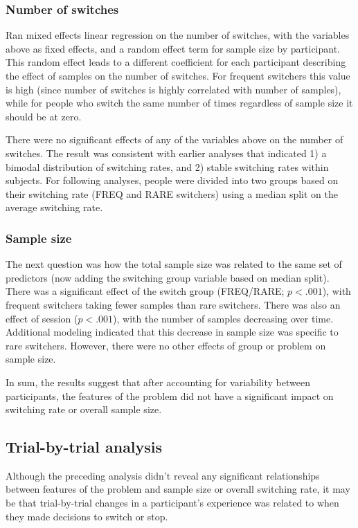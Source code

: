 \documentclass[english,doc]{apa}
\begin{document}
\subsubsection{Number of switches}

Ran mixed effects linear regression on the number of switches, with the variables above as fixed effects, and a random effect term for sample size by participant. 
This random effect leads to a different coefficient for each participant describing the effect of samples on the number of switches. 
For frequent switchers this value is high (since number of switches is highly correlated with number of samples), while for people who switch the same number of times regardless of sample size it should be at zero.

There were no significant effects of any of the variables above on the number of switches.
The result was consistent with earlier analyses that indicated 1) a bimodal distribution of switching rates, and 2) stable switching rates within subjects.
For following analyses, people were divided into two groups based on their switching rate (FREQ and RARE switchers) using a median split on the average switching rate.


\subsubsection{Sample size}

The next question was how the total sample size was related to the same set of predictors (now adding the switching group variable based on median split).
There was a significant effect of the switch group (FREQ/RARE; $p<.001$), with frequent switchers taking fewer samples than rare switchers. 
There was also an effect of session ($p<.001$), with the number of samples decreasing over time.
Additional modeling indicated that this decrease in sample size was specific to rare switchers. 
However, there were no other effects of group or problem on sample size.

In sum, the results suggest that after accounting for variability between participants, the features of the problem did not have a significant impact on switching rate or overall sample size.


\subsection{Trial-by-trial analysis}

Although the preceding analysis didn't reveal any significant relationships between features of the problem and sample size or overall switching rate, it may be that trial-by-trial changes in a participant's experience was related to when they made decisions to switch or stop.
\end{document}
